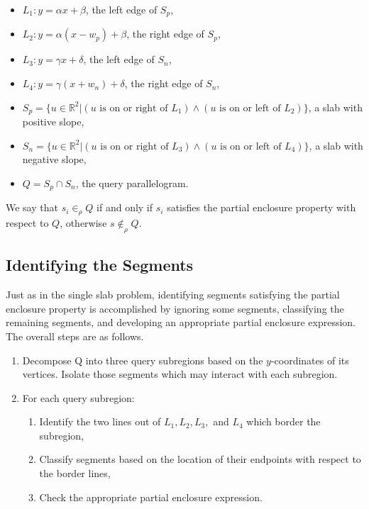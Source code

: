\begin{itemize}
 \item $L_1 : y = \alpha x + \beta$, the left edge of $S_p$,

 \item $L_2 : y = \alpha (x - w_p) + \beta$, the right edge of $S_p$,

 \item $L_3 : y = \gamma x + \delta$, the left edge of $S_n$,

 \item $L_4 : y = \gamma (x + w_n) + \delta$, the right edge of $S_n$,

 \item $S_p = \{ u \in \mathbb{R}^2 | (u \text{ is on or right of } L_1) \wedge (u \text{ is on or left of } L_2) \}$, a slab with positive slope,

 \item $S_n = \{ u \in \mathbb{R}^2 | (u \text{ is on or right of } L_3) \wedge (u \text{ is on or left of } L_4) \}$, a slab with negative slope,

 \item $Q = S_p \cap S_n$, the query parallelogram.

\end{itemize}

We say that $s_i \in_\rho Q$ if and only if $s_i$ satisfies the partial enclosure property with respect to $Q$, otherwise $s \not \in_\rho Q$.


\subsection{Identifying the Segments}
\label{:slabs:two:approach}

Just as in the single slab problem, identifying segments satisfying the partial enclosure property is accomplished by ignoring some segments, classifying the remaining segments, and developing an appropriate partial enclosure expression.
The overall steps are as follows.

\begin{enumerate}
 \item Decompose Q into three query subregions based on the $y$-coordinates of its vertices. Isolate those segments which may interact with each subregion.

 \item For each query subregion:
 \begin{enumerate}
  \item Identify the two lines out of $L_1, L_2, L_3,$ and $L_4$ which border the subregion,
  \item Classify segments based on the location of their endpoints with respect to the border lines,
  \item Check the appropriate partial enclosure expression.
 \end{enumerate}
\end{enumerate}

